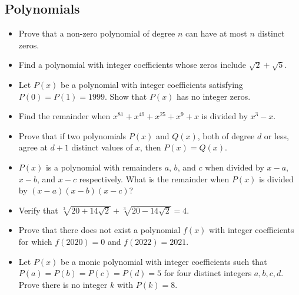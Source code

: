\documentclass[12pt]{article}
\begin{document}
\subsection{Polynomials}
\begin{itemize}
  \item Prove that a non-zero polynomial of degree $n$ can have at most $n$ distinct zeros.

  \item Find a polynomial with integer coefficients whose zeros include $\sqrt{2} + \sqrt{5}$.

  \item Let $P(x)$ be a polynomial with integer coefficients satisfying $P(0) = P(1) = 1999$. Show that $P(x)$ has no integer zeros.

  \item Find the remainder when $x^{81} + x^{49} + x^{25} + x^9 + x$ is divided by $x^3 - x$.

  \item Prove that if two polynomials $P(x)$ and $Q(x)$, both of degree $d$ or less, agree at $d+1$ distinct values of $x$, then $P(x) = Q(x)$.

  \item $P(x)$ is a polynomial with remainders $a$, $b$, and $c$ when divided by $x-a$, $x-b$, and $x-c$ respectively. What is the remainder when $P(x)$ is divided by $(x-a)(x-b)(x-c)$?

  \item Verify that $\sqrt[3]{20 + 14\sqrt{2}} + \sqrt[3]{20 - 14\sqrt{2}} = 4$.

  \item Prove that there does not exist a polynomial $f(x)$ with integer coefficients for which $f(2020)=0$ and $f(2022)=2021$.

  \item  Let $P(x)$ be a monic polynomial with integer coefficients such that $P(a)=P(b)=P(c)=P(d)=5$ for four distinct integers $a,b,c,d$. Prove there is no integer $k$ with $P(k)=8$.
\end{itemize}
\end{document}
